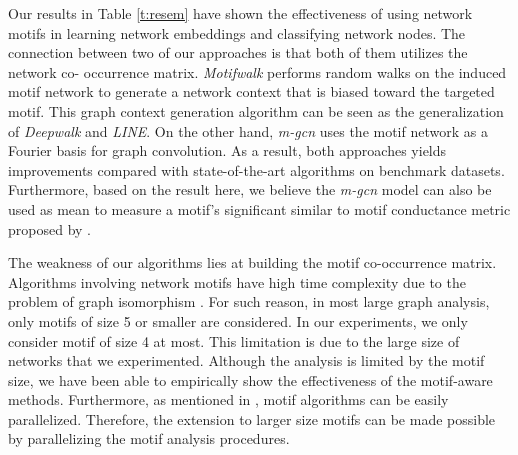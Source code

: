 \documentclass{article}
\theoremstyle{definition}
\begin{document}
Our results in Table \ref{t:resem} have shown the effectiveness of using network 
motifs in learning network embeddings and classifying network nodes. The connection 
between two of our approaches is that both of them utilizes the network co-
occurrence matrix. \emph{Motifwalk} performs random walks on the induced motif 
network to generate a network context that is biased toward the targeted motif. 
This graph context
generation algorithm can be seen as the generalization of \emph{Deepwalk} and
\emph{LINE}. On the other hand, \emph{m-gcn} uses the motif network as a Fourier 
basis for graph convolution. As a result, both approaches yields improvements 
compared with state-of-the-art algorithms on benchmark datasets. Furthermore, based 
on the result here, we believe the \emph{m-gcn} model can also be used as mean to 
measure a motif's significant similar to motif conductance metric proposed by 
\citeauthor{juremotif}.

The weakness of our algorithms lies at building the motif co-occurrence matrix.
Algorithms involving network motifs have high time complexity due to
the problem of graph isomorphism \cite{motifdecrev}. 
For such reason, in most large graph
analysis, only motifs of size 5 or smaller are considered. In our 
experiments, we only consider motif of size 4 at most. This limitation is 
due to the large size of networks that we experimented. Although the
analysis is limited by the motif size, we have been able to empirically 
show the effectiveness of the motif-aware methods. Furthermore, as 
mentioned in \cite{juremotif}, motif algorithms can be easily 
parallelized. Therefore, the extension to larger size motifs can be made 
possible by parallelizing the motif analysis procedures.



\end{document}
